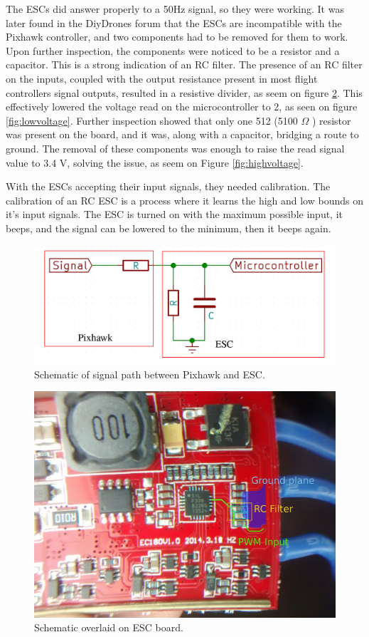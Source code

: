 The ESCs did answer properly to a 50Hz signal, so they were working.
%
It was later found in the DiyDrones\cite{diydronesesc} forum that the ESCs are incompatible with the Pixhawk controller, and two components had to be removed for them to work.
%
Upon further inspection, the components were noticed to be a resistor and a capacitor. This is a strong indication of an RC filter. The presence of an RC filter on the inputs, coupled with the output resistance present in most flight controllers signal outputs, resulted in a resistive divider, as seem on figure \ref{fig:divider}.
This effectively lowered the voltage read on the microcontroller to 2, as seen on figure \ref{fig:lowvoltage}.
Further inspection showed that only one 512 (5100 $\Omega$ ) resistor was present on the board, and it was, along with a capacitor, bridging a route to ground.
The removal of these components was enough to raise the read signal value to 3.4 V, solving the issue, as seem on Figure \ref{fig:highvoltage}.

With the ESCs accepting their input signals, they needed calibration. The calibration of an RC ESC is a process where it learns the high and low bounds on it's input signals. The ESC is turned on with the maximum possible input, it beeps, and the signal can be lowered to the minimum, then it beeps again.


\begin{figure}[H]
\centering
  \includegraphics[width=\linewidth]{figs/divider.png}
  \caption{Schematic of signal path between Pixhawk and ESC.}
  \label{fig:divider}
\end{figure}
	
\begin{figure}[H]
\centering
  \includegraphics[width=0.7\linewidth]{figs/escbeforeschematic.jpg}
  \caption{Schematic overlaid on ESC board.}
  \label{fig:divider}
\end{figure}
	


